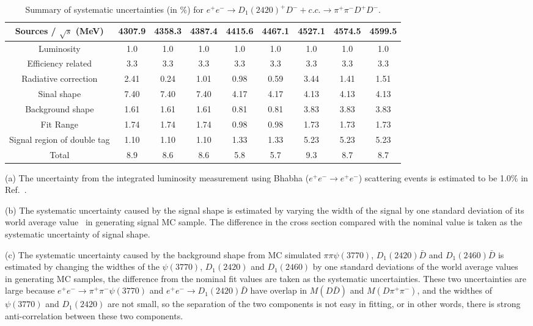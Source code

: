 \documentclass[aps,preprint,superscriptaddress,12pt,tightenlines]{revtex4}
\newcommand{\pp}{\pi^+\pi^-}
\newcommand{\ddc}{D^+D^-}
\begin{document}
\begin{table}[htbp]
\caption{Summary of systematic uncertainties (in $\%$) for
$e^{+}e^{-}\to D_{1}(2420)^{+}D^{-}+c.c.\to \pp\ddc$.}
\label{sys_err_Dp}
\begin{tabular}{c  c c c c c c c c}
\hline \hline
    Sources / $\sqrt{s}$ (MeV)   &4307.9   &4358.3  &4387.4   &4415.6  &4467.1   &4527.1  &4574.5   &4599.5 \\
    \hline
    Luminosity                   & 1.0   & 1.0   & 1.0   & 1.0   & 1.0   & 1.0  & 1.0   & 1.0 \\
    Efficiency related           &3.3    &3.3    &3.3    &3.3    &3.3    &3.3   &3.3    &3.3\\
    Radiative correction         &2.41   &0.24   &1.01   &0.98   &0.59   &3.44  &1.41   &1.51\\
    Sinal shape                  &7.40   &7.40   &7.40   &4.17   &4.17   &4.13  &4.13   &4.13 \\
    Background shape             &1.61   &1.61   &1.61   &0.81   &0.81   &3.83  &3.83   &3.83  \\
    Fit Range                    &1.74   &1.74   &1.74   &0.98   &0.98   &1.73  &1.73   &1.73  \\
    Signal region of double tag  &1.10   &1.10   &1.10   &1.33   &1.33   &5.23  &5.23   &5.23\\
    \hline
    Total                        &8.9   &8.6  &8.6  &5.8  &5.7  &9.3  &8.7  &8.7       \\
    \hline
    \hline
\end{tabular}
\end{table}

(a) The uncertainty from the integrated luminosity measurement
using Bhabha ($e^{+}e^{-}\to e^{+}e^{-}$) scattering events is
estimated to be 1.0\% in Ref.~\cite{luminosity}.

(b) The systematic uncertainty caused by the signal shape is
estimated by varying the width of the signal by one standard
deviation of its world average value~\cite{PDG} in generating
signal MC sample. The difference in the cross section compared
with the nominal value is taken as the systematic uncertainty of
signal shape.

(c) The systematic uncertainty caused by the background shape from
MC simulated $\pi\pi\psi(3770)$, $D_{1}(2420)\bar{D}$ and $D_{1}(2460)\bar{D}$ is estimated by
changing the widthes of the $\psi(3770)$, $D_{1}(2420)$ and $D_{1}(2460)$ by one
standard deviations of the world average values~\cite{PDG} in
generating MC samples, the difference from the nominal fit values
are taken as the systematic uncertainties. These two uncertainties
are large because $e^{+}e^{-}\to \pp\psi(3770)$ and $e^{+}e^{-}\to
D_{1}(2420)\bar{D}$ have overlap in $M(D\bar{D})$ and
$M(D\pi^{+}\pi^{-})$, and the widthes of $\psi(3770)$ and
$D_{1}(2420)$ are not small, so the separation of the two
components is not easy in fitting, or in other words, there is
strong anti-correlation between these two components.
\end{document}
